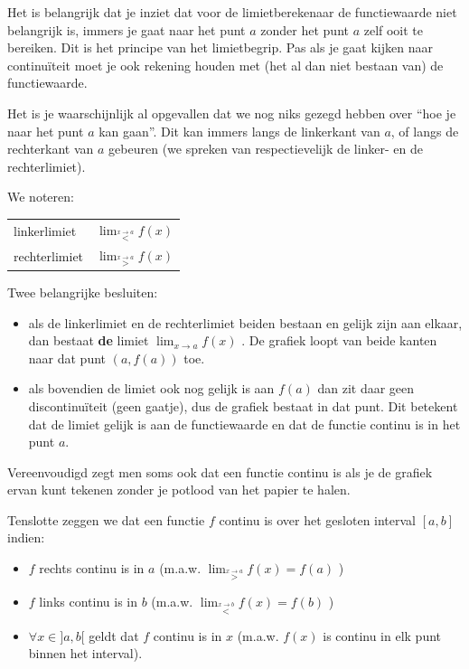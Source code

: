 Het is belangrijk dat je inziet dat voor de limietberekenaar
de functiewaarde niet belangrijk is, immers je gaat naar het punt
$a$ zonder het punt $a$ zelf ooit te bereiken. Dit is het principe
van het limietbegrip. Pas als je gaat kijken naar continu\"iteit moet
je ook rekening houden met (het al dan niet bestaan van) de functiewaarde.


Het is je waarschijnlijk al opgevallen dat we nog niks gezegd
hebben over ``hoe je naar het punt $a$ kan gaan''. Dit kan immers
langs de linkerkant van $a$, of langs de rechterkant van $a$ gebeuren
(we spreken van respectievelijk de linker- en de rechterlimiet).


We noteren: %
\begin{tabular}{l|l}
linkerlimiet & $\lim_{\overset{x\rightarrow a}{<}}f(x)$\\
rechterlimiet & $\lim_{\overset{x\rightarrow a}{>}}f(x)$\\
\end{tabular}

\begin{ftonthoud}
	Twee belangrijke besluiten:
\begin{itemize}
\item als de linkerlimiet en de rechterlimiet beiden bestaan en gelijk zijn
aan elkaar, dan bestaat \textbf{de} limiet $\lim_{x\to a}f(x)$
. De grafiek loopt van beide kanten naar dat punt $(a,f(a))$ toe.
\item als bovendien de limiet ook nog gelijk is aan $f(a)$ dan zit daar
geen discontinu\"iteit (geen gaatje), dus de grafiek bestaat in dat
punt. Dit betekent dat de limiet gelijk is aan de functiewaarde en
dat de functie continu is in het punt $a$.
\end{itemize}
Vereenvoudigd zegt men soms ook dat een functie continu
is als je de grafiek ervan kunt tekenen zonder je potlood van het
papier te halen.
\end{ftonthoud}


Tenslotte zeggen we dat een functie $f$ continu is over
het gesloten interval $[a,b]$ indien:
\begin{itemize}
\item $f$ rechts continu is in $a$ (m.a.w. $\lim_{\overset{x\rightarrow a}{>}}f(x)=f(a)$
)
\item $f$ links continu is in $b$ (m.a.w. $\lim_{\overset{x\rightarrow b}{<}}f(x)=f(b)$
)
\item $\forall x\in]a,b[$ geldt dat $f$ continu is in $x$ (m.a.w. $f(x)$
is continu in elk punt binnen het interval).
\end{itemize}



